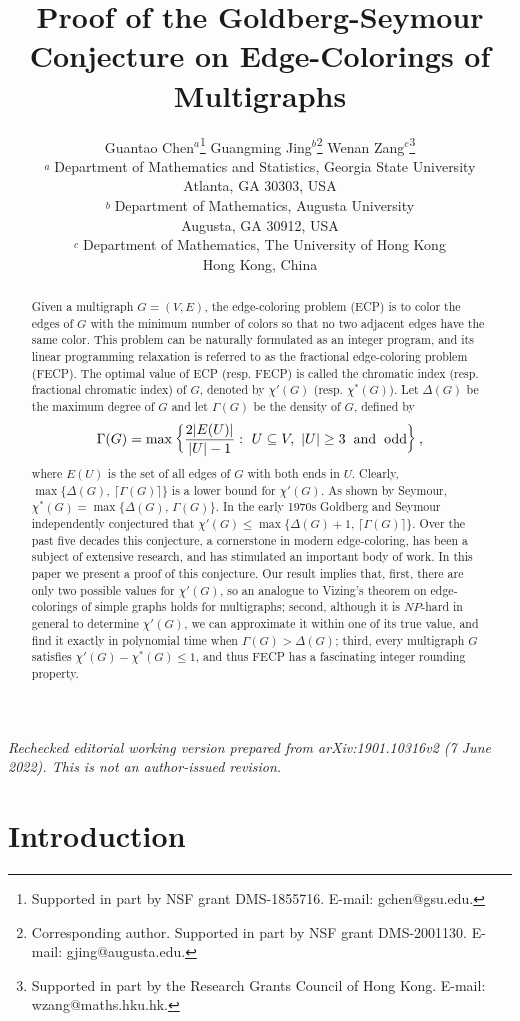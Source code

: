 \documentclass[11pt]{article}
\title{\bf Proof of the Goldberg-Seymour Conjecture on Edge-Colorings of Multigraphs}
\author{\vspace{2mm} Guantao Chen$^{a}$\thanks{Supported in part by NSF grant DMS-1855716. E-mail: gchen@gsu.edu.} 
\quad Guangming Jing$^{b}$\thanks{Corresponding author. Supported in part by NSF grant DMS-2001130. E-mail: gjing@augusta.edu.} \quad
Wenan Zang$^{c}$\thanks{Supported in part by the Research Grants Council of Hong Kong. E-mail: wzang@maths.hku.hk.}\\
$\stackrel{a}{}$ Department of Mathematics and Statistics, Georgia State University\\
Atlanta, GA 30303, USA \smallskip\\ 
$\stackrel{b}{}$ Department of Mathematics, Augusta University\\Augusta, GA 30912, USA \smallskip\\ 
$\stackrel{c}{}$ Department of Mathematics, The University of Hong Kong\\Hong Kong, China }
\begin{document}
\date{}
\maketitle

\begin{center}
\small\itshape Rechecked editorial working version prepared from arXiv:1901.10316v2 (7 June 2022). This is not an author-issued revision.
\end{center}
\vspace{1mm}

\begin{abstract}
Given a multigraph $G=(V,E)$, the edge-coloring problem (ECP) is to color the edges of $G$ with the minimum number 
of colors so that no two adjacent edges have the same color. This problem can be naturally formulated as an integer
program, and its linear programming relaxation is referred to as the fractional edge-coloring problem (FECP). 
The optimal value of ECP (resp. FECP) is called the chromatic index (resp. fractional chromatic 
index) of $G$, denoted by $\chi'(G)$ (resp. $\chi^*(G)$). Let $\Delta(G)$ be the maximum degree of $G$ and let 
$\Gamma(G)$ be the density of $G$, defined by  
\[\Gamma(G)=\max \left\{\frac{2|E(U)|}{|U|-1}:\,\, U \subseteq V, \,\, |U|\ge 3 \hskip 2mm
{\rm and \hskip 2mm odd} \right\},\]
where $E(U)$ is the set of all edges of $G$ with both ends in $U$.  Clearly, $\max\{\Delta(G), \, 
\lceil \Gamma(G) \rceil \}$ is a lower bound for $\chi'(G)$. As shown by Seymour, $\chi^*(G)=\max\{\Delta(G), \, 
\Gamma(G)\}$. In the early 1970s Goldberg and Seymour independently conjectured that $\chi'(G) \le \max\{\Delta(G)+1, 
\, \lceil \Gamma(G) \rceil\}$. Over the past five decades this conjecture, a cornerstone in modern edge-coloring, 
has been a subject of extensive research, and has stimulated an important body of work. In this paper we present 
a proof of this conjecture. Our result implies that, first, there are only two possible values for 
$\chi'(G)$, so an analogue to Vizing's theorem on edge-colorings of simple graphs holds for multigraphs; second, 
although it is $NP$-hard in general to determine $\chi'(G)$, we can approximate it within one of its true value, and 
find it exactly in polynomial time when $\Gamma(G)>\Delta(G)$; third, every multigraph $G$ satisfies $\chi'(G)-\chi^*(G) 
\le 1$, and thus FECP has a fascinating integer rounding property.  
\end{abstract}

\newpage


\section{Introduction}
\end{document}
